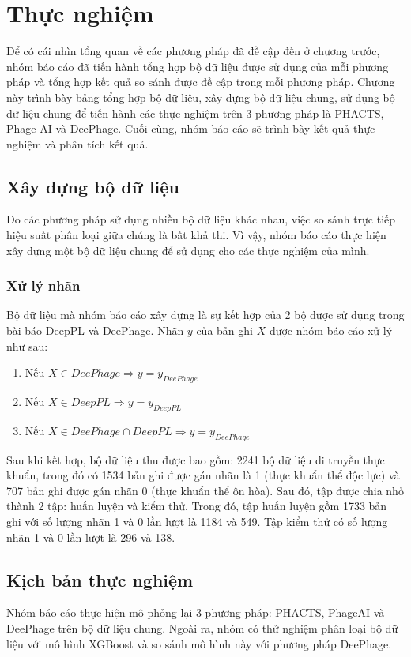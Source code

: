 \chapter{Thực nghiệm}
Để có cái nhìn tổng quan về các phương pháp đã đề cập đến ở chương trước, nhóm báo cáo đã tiến hành tổng hợp bộ dữ liệu được sử dụng của mỗi phương pháp và tổng hợp kết quả so sánh được đề cập trong mỗi phương pháp. Chương này trình bày bảng tổng hợp bộ dữ liệu, xây dựng bộ dữ liệu chung, sử dụng bộ dữ liệu chung để tiến hành các thực nghiệm trên 3 phương pháp là PHACTS, Phage AI và DeePhage. Cuối cùng, nhóm báo cáo sẽ trình bày kết quả thực nghiệm và phân tích kết quả.

\section{Xây dựng bộ dữ liệu}
Do các phương pháp sử dụng nhiều bộ dữ liệu khác nhau, việc so sánh trực tiếp hiệu suất phân loại giữa chúng là bất khả thi. Vì vậy, nhóm báo cáo thực hiện xây dựng một bộ dữ liệu chung để sử dụng cho các thực nghiệm của mình.
\subsection*{ Xử lý nhãn }
Bộ dữ liệu mà nhóm báo cáo xây dựng là sự kết hợp của 2 bộ được sử dụng trong bài báo DeepPL và DeePhage. Nhãn $y$ của bản ghi $X$ được nhóm báo cáo xử lý như sau:
\begin{enumerate}
    \item Nếu $X \in DeePhage \Rightarrow y = y_{DeePhage}$ 
    \item Nếu $X \in DeepPL \Rightarrow y = y_{DeepPL}$
    \item Nếu $X \in DeePhage \cap DeepPL \Rightarrow y = y_{DeePhage}$
\end{enumerate}
Sau khi kết hợp, bộ dữ liệu thu được bao gồm: 2241 bộ dữ liệu di truyền thực khuẩn, trong đó có 1534 bản ghi được gán nhãn là 1 (thực khuẩn thể độc lực) và 707 bản ghi được gán nhãn 0 (thực khuẩn thể ôn hòa). Sau đó, tập được chia nhỏ thành 2 tập: huấn luyện và kiểm thử. Trong đó, tập huấn luyện gồm 1733 bản ghi với số lượng nhãn 1 và 0 lần lượt là 1184 và 549. Tập kiểm thử có số lượng nhãn 1 và 0 lần lượt là 296 và 138.

\section{Kịch bản thực nghiệm}\label{ kịch bản thực nghiệm}
Nhóm báo cáo thực hiện mô phỏng lại 3 phương pháp: PHACTS, PhageAI và DeePhage trên bộ dữ liệu chung. Ngoài ra, nhóm có thử nghiệm phân loại bộ dữ liệu với mô hình XGBoost và so sánh mô hình này với phương pháp DeePhage.

